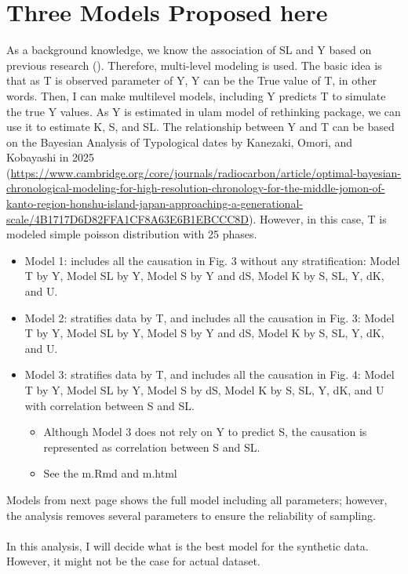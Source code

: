 \documentclass{article}
\begin{document}
\section{Three Models Proposed here}
As a background knowledge, we know the association of SL and Y based on previous research (). Therefore, multi-level modeling is used. 
The basic idea is that as T is observed parameter of Y, Y can be the True value of T, in other words. Then, I can make multilevel models, including Y predicts T to simulate the true Y values. As Y is estimated in ulam model of rethinking package, we can use it to estimate K, S, and SL.
The relationship between Y and T can be based on the Bayesian Analysis of Typological dates by Kanezaki, Omori, and Kobayashi in 2025 (\url{https://www.cambridge.org/core/journals/radiocarbon/article/optimal-bayesian-chronological-modeling-for-high-resolution-chronology-for-the-middle-jomon-of-kanto-region-honshu-island-japan-approaching-a-generational-scale/4B1717D6D82FFA1CF8A63E6B1EBCCC8D}). 
However, in this case, T is modeled simple poisson distribution with 25 phases.



\begin{itemize}

    \item Model 1: includes all the causation in Fig. 3 without any stratification: Model T by Y, Model SL by Y, Model S by Y and dS, Model K by S, SL, Y, dK, and U. 

    \item Model 2: stratifies data by T, and includes all the causation in Fig. 3: Model T by Y, Model SL by Y, Model S by Y and dS, Model K by S, SL, Y, dK, and U. 

    \item Model 3: stratifies data by T, and includes all the causation in Fig. 4: Model T by Y, Model SL by Y, Model S by dS, Model K by S, SL, Y, dK, and U with correlation between S and SL.
    \begin{itemize}
        \item Although Model 3 does not rely on Y to predict S, the causation is represented as correlation between S and SL. 
    \end{itemize} 
    \begin{itemize}
        \item See the m.Rmd and m.html
    \end{itemize}
\end{itemize}

Models from next page shows the full model including all parameters; however, the analysis removes several parameters to ensure the reliability of sampling. \\
\\
In this analysis, I will decide what is the best model for the synthetic data. However, it might not be the case for actual dataset. 
\end{document}
